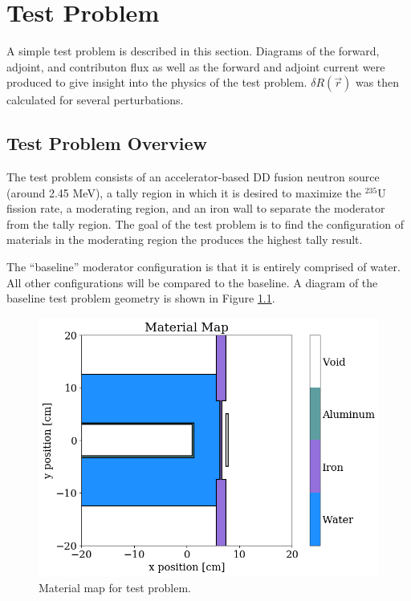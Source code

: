 \chapter{Test Problem}
\label{chap:testprob}

A simple test problem is described in this section.
Diagrams of the forward, adjoint, and contributon flux as well as the forward and adjoint current were produced to give insight into the physics of the test problem.
$\delta R\left(\vec{r}\right)$ was then calculated for several perturbations.


\section{Test Problem Overview}
\label{sec:bg:tp:overview}

The test problem consists of an accelerator-based DD fusion neutron source (around 2.45 MeV), a tally region in which it is desired to maximize the ${}^{235}\text{U}$ fission rate, a moderating region, and an iron wall to separate the moderator from the tally region.
The goal of the test problem is to find the configuration of materials in the moderating region the produces the highest tally result.

The ``baseline'' moderator configuration is that it is entirely comprised of water.
All other configurations will be compared to the baseline.
A diagram of the baseline test problem geometry is shown in Figure \ref{fig:tp:material_map}.

\begin{figure}[h!]
  \centering
  \includegraphics[width=0.75\linewidth]{content/testprob/material_map.png}
  \caption{Material map for test problem.}
  \label{fig:tp:material_map}
\end{figure}


